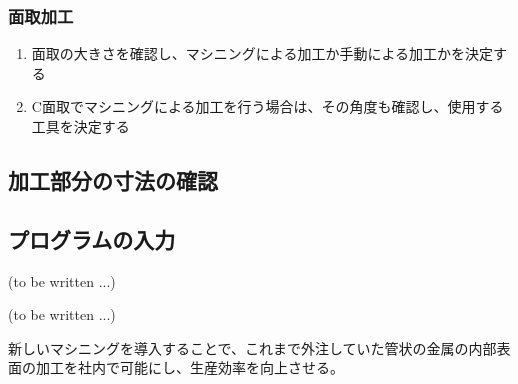 \clearpage
\subsubsection{面取加工}
\begin{enumerate}
\item {}面取の大きさを確認し、マシニングによる加工か手動による加工かを決定する
\item {}C面取でマシニングによる加工を行う場合は、その角度も確認し、使用する工具を決定する
\end{enumerate}


\subsection{加工部分の寸法の確認\TBW}


\subsection{プログラムの入力\TBW}
(to be written ...)




(to be written ...)



新しいマシニングを導入することで、これまで外注していた管状の金属の内部表面の加工を社内で可能にし、生産効率を向上させる。



